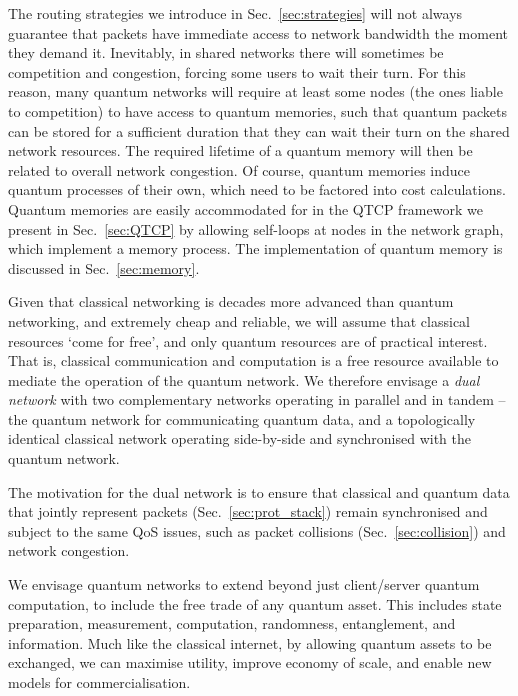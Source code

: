 The routing strategies we introduce in Sec.~\ref{sec:strategies} will not always guarantee that packets have immediate access to network bandwidth the moment they demand it. Inevitably, in shared networks there will sometimes be competition and congestion, forcing some users to wait their turn. For this reason, many quantum networks will require at least some nodes (the ones liable to competition) to have access to quantum memories, such that quantum packets can be stored for a sufficient duration that they can wait their turn on the shared network resources. The required lifetime of a quantum memory will then be related to overall network congestion. Of course, quantum memories induce quantum processes of their own, which need to be factored into cost calculations. Quantum memories are easily accommodated for in the QTCP framework we present in Sec.~\ref{sec:QTCP} by allowing self-loops at nodes in the network graph, which implement a memory process. The implementation of quantum memory is discussed in Sec.~\ref{sec:memory}.

Given that classical networking is decades more advanced than quantum networking, and extremely cheap and reliable, we will assume that classical resources `come for free', and only quantum resources are of practical interest. That is, classical communication and computation is a free resource available to mediate the operation of the quantum network. We therefore envisage a \textit{dual network} with two complementary networks operating in parallel and in tandem -- the quantum network for communicating quantum data, and a topologically identical classical network operating side-by-side and synchronised with the quantum network.

The motivation for the dual network is to ensure that classical and quantum data that jointly represent packets (Sec.~\ref{sec:prot_stack}) remain synchronised and subject to the same QoS issues, such as packet collisions (Sec.~\ref{sec:collision}) and network congestion.

We envisage quantum networks to extend beyond just client/server quantum computation, to include the free trade of any quantum asset. This includes state preparation, measurement, computation, randomness, entanglement, and information. Much like the classical internet, by allowing quantum assets to be exchanged, we can maximise utility, improve economy of scale, and enable new models for commercialisation.

